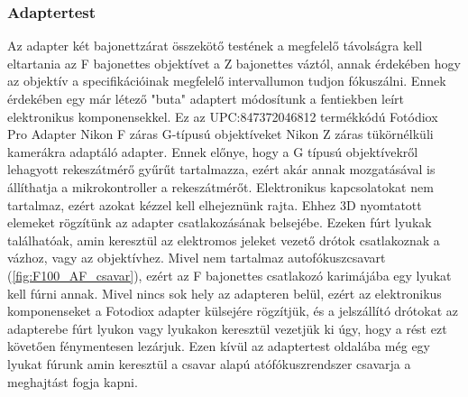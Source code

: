 \subsubsection{Adaptertest}
Az adapter két bajonettzárat összekötő testének a megfelelő távolságra kell eltartania az F bajonettes objektívet a Z bajonettes váztól, annak érdekében hogy az objektív a specifikációinak megfelelő intervallumon tudjon fókuszálni. Ennek érdekében egy már létező "buta" adaptert módosítunk a fentiekben leírt elektronikus komponensekkel. Ez az UPC:847372046812 termékkódú Fotódiox Pro Adapter Nikon F záras G-típusú objektíveket Nikon Z záras tükörnélküli kamerákra adaptáló adapter. Ennek előnye, hogy a G típusú objektívekről lehagyott rekeszátmérő gyűrűt tartalmazza, ezért akár annak mozgatásával is állíthatja a mikrokontroller a rekeszátmérőt. Elektronikus kapcsolatokat nem tartalmaz, ezért azokat kézzel kell elhejeznünk rajta. Ehhez 3D nyomtatott elemeket rögzítünk az adapter csatlakozásának belsejébe. Ezeken fúrt lyukak találhatóak, amin keresztül az elektromos jeleket vezető drótok csatlakoznak a vázhoz, vagy az objektívhez. Mivel nem tartalmaz autofókuszcsavart (\ref{fig:F100_AF_csavar}), ezért az F bajonettes csatlakozó karimájába egy lyukat kell fúrni annak. Mivel nincs sok hely az adapteren belül, ezért az elektronikus komponenseket a Fotodiox adapter külsejére rögzítjük, és a jelszállító drótokat az adapterebe fúrt lyukon vagy lyukakon keresztül vezetjük ki úgy, hogy a rést ezt követően fénymentesen lezárjuk. Ezen kívül az adaptertest oldalába még egy lyukat fúrunk amin keresztül a csavar alapú atófókuszrendszer csavarja a meghajtást fogja kapni.
